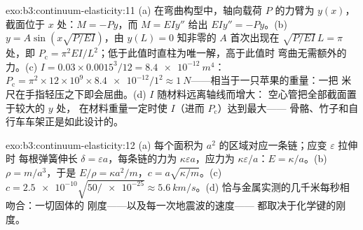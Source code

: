 \begin{solution}{exo:b3:continuum-elasticity:11}
(a) 在弯曲构型中，轴向载荷 $P$ 的力臂为
$y(x)$，截面位于 $x$ 处：$M = -Py$，而 $M = EIy''$ 给出
$EIy'' = -Py$。(b) $y = A\sin(x\sqrt{P/EI})$，由 $y(L) = 0$ 知非零的
$A$ 首次出现在 $\sqrt{P/EI}\,L = \pi$ 处，即 $P_{\text{c}} =
\pi^2EI/L^2$；低于此值时直柱为唯一解，高于此值时
弯曲无需额外的力。(c) $I = 0.03 \times 0.0015^3/12 =
\qty{8.4e-12}{m^4}$：$P_{\text{c}} = \pi^2 \times 12\times10^9 \times
\num{8.4e-12}/1^2 \approx \qty{1}{N}$——相当于一只苹果的重量：一把
米尺在手指轻压之下即会屈曲。(d) $I$ 随材料远离轴线而增大：
空心管把全部截面置于较大的 $y$ 处，
在材料重量一定时使 $I$（进而 $P_{\text{c}}$）达到最大——
骨骼、竹子和自行车车架正是如此设计的。
\end{solution}

\begin{solution}{exo:b3:continuum-elasticity:12}
(a) 每个面积为 $a^2$ 的区域对应一条链；应变 $\varepsilon$ 拉伸时
每根弹簧伸长 $\delta = \varepsilon a$，每条链的力为 $\kappa
\varepsilon a$，应力为 $\kappa\varepsilon/a$：$E =
\kappa/a$。(b) $\rho = m/a^3$，于是 $E/\rho = \kappa a^2/m$，$c =
a\sqrt{\kappa/m}$。(c) $c = \num{2.5e-10}\sqrt{50/\num{e-25}} \approx
\qty{5.6}{km/s}$。(d) 恰与金属实测的几千米每秒相吻合：一切固体的
刚度——以及每一次地震波的速度——
都取决于化学键的刚度。
\end{solution}

